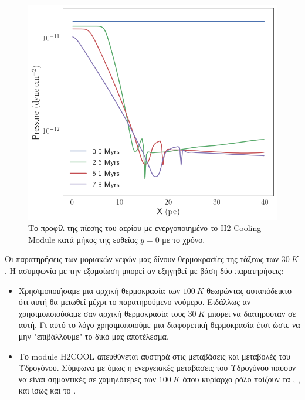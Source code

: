 \documentclass[article,a4paper,11.2pt]{memoir}
\numberwithin{equation}{subsection}
\begin{document}
\begin{figure}[h]
	\begin{adjustwidth}{-5cm}{-0cm}
	\includegraphics[width=1\linewidth]{DataImages/H2CoolingPRSprofile}
	\caption{Το προφίλ της πίεσης του αερίου με ενεργοποιημένο το Η2 Cooling Module κατά μήκος της ευθείας $y=0$ με το χρόνο.}
	\label{fig:h2coolingprsprofile}
	\end{adjustwidth}
\end{figure}

	

	
	Οι παρατηρήσεις των μοριακών νεφών μας δίνουν θερμοκρασίες της τάξεως των $\SI{30}{K}$. Η ασυμφωνία με την εξομοίωση μπορεί αν εξηγηθεί με βάση δύο παρατηρήσεις:
	\begin{itemize}
		\item Χρησιμοποιήσαμε μια αρχική θερμοκρασία των $\SI{100}{K}$ θεωρώντας αυταπόδεικτο ότι αυτή θα μειωθεί μέχρι το παρατηρούμενο νούμερο. Ειδάλλως αν χρησιμοποιούσαμε σαν αρχική θερμοκρασία τους $\SI{30}{K}$ μπορεί να διατηρούταν σε αυτή. Γι αυτό το λόγο χρησιμοποιούμε μια διαφορετική θερμοκρασία έτσι ώστε να μην "επιβάλλουμε" το δικό μας αποτέλεσμα.
		\item Το module H2COOL απευθύνεται αυστηρά στις μεταβάσεις και μεταβολές του Υδρογόνου. Σύμφωνα με  όμως η ενεργειακές μεταβάσεις του Υδρογόνου παύουν να είναι σημαντικές σε χαμηλότερες των $\SI{100}{K}$ όπου κυρίαρχο ρόλο παίζουν τα , ,  και ίσως και το .
	\end{itemize}
	
\end{document}
